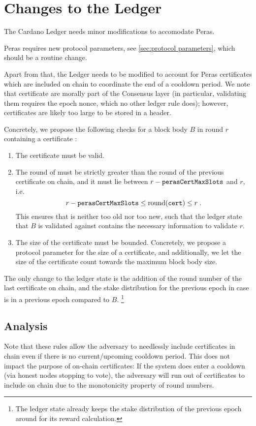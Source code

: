 \section{Changes to the Ledger}\label{sec:ledger changes}

The Cardano Ledger \parencite{shelley-ledger-specs,cardano-formal-ledger-specs} needs minor modifications to accomodate Peras.

Peras requires new protocol parameters, see \cref{sec:protocol parameters}, which should be a routine change.

Apart from that, the Ledger needs to be modified to account for Peras certificates which are included on chain to coordinate the end of a cooldown period.
We note that certificate are morally part of the Consensus layer (in particular, validating them requires the epoch nonce, which no other ledger rule does); however, certificates are likely too large to be stored in a header.

Concretely, we propose the following checks for a block body $B$ in round $r$ containing a certificate \cert{}:
\begin{enumerate}
\item
  The certificate \cert{} must be valid.
\item
  The round of \cert{} must be strictly greater than the round of the previous certificate on chain, and it must lie between $r-\mathtt{perasCertMaxSlots}$ and $r$, i.e.\
  \[ r-\mathtt{perasCertMaxSlots} \le \operatorname{round}(\mathtt{cert}) \le r \;. \]
  This ensures that \cert{} is neither too old nor too new, such that the ledger state that $B$ is validated against contains the necessary information to validate $r$.
\item
  The size of the certificate must be bounded.
  Concretely, we propose a protocol parameter \perasCertSizeLimit{} for the size of a certificate, and additionally, we let the size of the certificate count towards the maximum block body size.
\end{enumerate}
The only change to the ledger state is the addition of the round number of the last certificate on chain, and the stake distribution for the previous epoch in case \cert{} is in a previous epoch compared to $B$.%
\footnote{The ledger state already keeps the stake distribution of the previous epoch around for its reward calculation.}

\subsection{Analysis}
Note that these rules allow the adversary to needlessly include certificates in chain even if there is no current/upcoming cooldown period.
This does not impact the purpose of on-chain certificates:
If the system does enter a cooldown (via honest nodes stopping to vote), the adversary will run out of certificates to include on chain due to the monotonicity property of round numbers.


